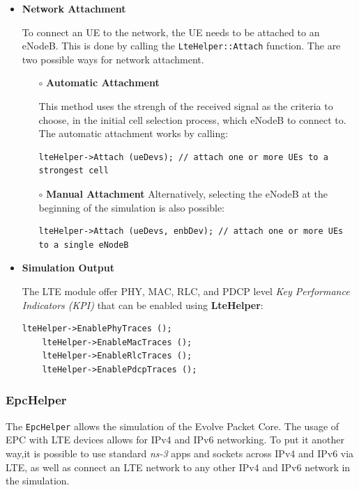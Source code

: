 \begin{itemize}
  \item \textbf{Network Attachment}
  
  To connect an UE to the network, the UE needs to be attached to an eNodeB. This is done by calling the
  \texttt{LteHelper::Attach} function. The are two possible ways for network attachment.

  \begin{itemize}
    \item[$\circ$] \textbf{Automatic Attachment}

    This method uses the strengh of the received signal as the criteria to choose, in the initial cell selection process, which eNodeB to connect to. The automatic attachment 
    works by calling:

    \begin{lstlisting}[language=myC++,caption={UE Automatic Attachment}, captionpos=b]
    lteHelper->Attach (ueDevs); // attach one or more UEs to a strongest cell
    \end{lstlisting}
    
    \item[$\circ$] \textbf{Manual Attachment}
    Alternatively, selecting the eNodeB at the beginning of the simulation is also possible:

    \begin{lstlisting}[language=myC++,caption={UE Manual Attachment}, captionpos=b]
    lteHelper->Attach (ueDevs, enbDev); // attach one or more UEs to a single eNodeB
    \end{lstlisting}
  \end{itemize}

  \item \textbf{Simulation Output}
  
  The LTE module offer PHY, MAC, RLC, and PDCP level \textit{Key Performance Indicators (KPI)}
  that can be enabled using \textbf{LteHelper}:

  \begin{lstlisting}[language=myC++,caption={Enable LTE trace outputs}, captionpos=b]
    lteHelper->EnablePhyTraces ();
    lteHelper->EnableMacTraces ();
    lteHelper->EnableRlcTraces ();
    lteHelper->EnablePdcpTraces ();
  \end{lstlisting}
\end{itemize}

\subsubsection{EpcHelper}
The \texttt{EpcHelper} allows the simulation of the Evolve Packet Core. The usage of EPC with 
LTE devices allows for IPv4 and IPv6 networking. To put it another way,it is possible to use 
standard \textit{ns-3} apps and sockets across IPv4 and IPv6 via LTE, as well as connect an LTE network 
to any other IPv4 and IPv6 network in the simulation.

